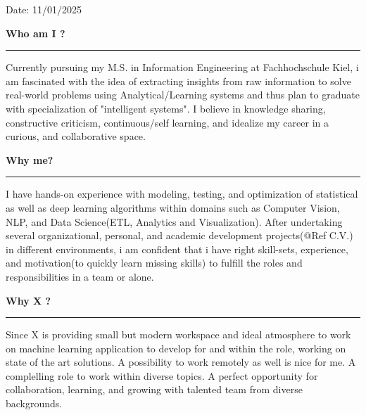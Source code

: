 \documentclass[11pt,A4]{article}
\begin{document}
\begin{flushright}
{Date: 11/01/2025}
\end{flushright}

\vspace{10pt}

\vspace{10pt}

\textbf{Who am I ?}
\vspace{5pt}
\textcolor{softcol}{\hrule}
\vspace{5pt}

Currently pursuing my M.S. in Information Engineering at Fachhochschule Kiel, i am fascinated with the idea of extracting insights from raw information to solve real-world problems using Analytical/Learning systems and thus plan to graduate with specialization of "intelligent systems". I believe in knowledge sharing, constructive criticism, continuous/self learning, and idealize my career in a curious, and collaborative space.
\vspace{15pt}

\textbf{Why me?}
\vspace{5pt}
\textcolor{softcol}{\hrule}
\vspace{5pt}

I have hands-on experience with modeling, testing, and optimization of statistical as well as deep learning algorithms within domains such as Computer Vision, NLP, and Data Science(ETL, Analytics and Visualization). After undertaking several organizational, personal, and academic development projects(@Ref C.V.) in different environments, i am confident that i have right skill-sets, experience, and motivation(to quickly learn missing skills) to fulfill the roles and responsibilities in a team or alone. 
\vspace{15pt}

\textbf{Why X ?}
\vspace{5pt}
\textcolor{softcol}{\hrule}
\vspace{5pt}


Since X  is providing small but modern workspace and ideal atmosphere to work on machine learning application to develop for and within the role, working on state of the art solutions. A possibility to work remotely as well is nice for me. A complelling role to work within diverse topics. A perfect opportunity for collaboration, learning, and growing with talented team from diverse backgrounds.
\end{document}
